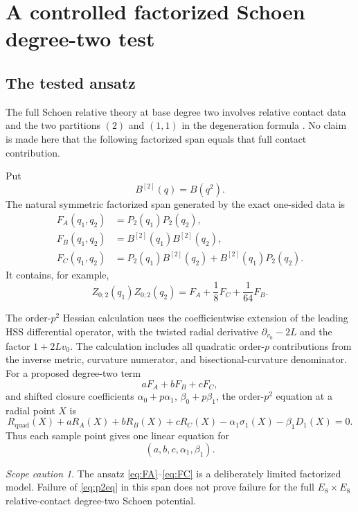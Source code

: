 \documentclass[11pt]{article}
\theoremstyle{definition}
\theoremstyle{remark}
\newtheorem{caution}[theorem]{Scope caution}
\begin{document}
\section{A controlled factorized Schoen degree-two test}

\subsection{The tested ansatz}

The full Schoen relative theory at base degree two involves relative contact data and the two partitions \((2)\) and \((1,1)\) in the degeneration formula \cite{OP}.  No claim is made here that the following factorized span equals that full contact contribution.

Put
\begin{equation}\label{eq:B2}
 B^{[2]}(q)=B(q^2).
\end{equation}
The natural symmetric factorized span generated by the exact one-sided data is
\begin{align}
 F_A(q_1,q_2)&=P_2(q_1)P_2(q_2),\label{eq:FA}\\
 F_B(q_1,q_2)&=B^{[2]}(q_1)B^{[2]}(q_2),\label{eq:FB}\\
 F_C(q_1,q_2)&=P_2(q_1)B^{[2]}(q_2)+B^{[2]}(q_1)P_2(q_2).\label{eq:FC}
\end{align}
It contains, for example,
\begin{equation}\label{eq:Z2product}
 Z_{0;2}(q_1)Z_{0;2}(q_2)
 =F_A+\frac18F_C+\frac1{64}F_B.
\end{equation}

The order-\(p^2\) Hessian calculation uses the coefficientwise extension of the leading HSS differential operator, with the twisted radial derivative \(\partial_{v_0}-2L\) and the factor \(1+2Lv_0\).  The calculation includes all quadratic order-\(p\) contributions from the inverse metric, curvature numerator, and bisectional-curvature denominator.  For a proposed degree-two term
\[
 aF_A+bF_B+cF_C,
\]
and shifted closure coefficients \(\alpha_0+p\alpha_1\), \(\beta_0+p\beta_1\), the order-\(p^2\) equation at a radial point \(X\) is
\begin{equation}\label{eq:p2eq}
 R_{\mathrm{quad}}(X)+aR_A(X)+bR_B(X)+cR_C(X)
 -\alpha_1\sigma_1(X)-\beta_1D_1(X)=0.
\end{equation}
Thus each sample point gives one linear equation for
\[
 (a,b,c,\alpha_1,\beta_1).
\]

\begin{caution}\label{caution:ansatz}
The ansatz \eqref{eq:FA}--\eqref{eq:FC} is a deliberately limited factorized model.  Failure of \eqref{eq:p2eq} in this span does not prove failure for the full \(E_8\times E_8\) relative-contact degree-two Schoen potential.
\end{caution}
\end{document}
